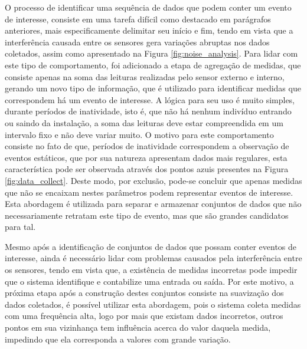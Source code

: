 O processo de identificar uma sequência de dados que podem conter um evento de interesse, consiste em uma tarefa difícil como destacado em parágrafos anteriores, mais especificamente delimitar seu início e fim, tendo em vista que a interferência causada entre os sensores gera variações abruptas nos dados coletados, assim como apresentado na Figura \ref{fig:noise_analysis}. Para lidar com este tipo de comportamento, foi adicionado a etapa de agregação de medidas, que consiste apenas na soma das leituras realizadas pelo sensor externo e interno, gerando um novo tipo de informação, que é utilizado para identificar medidas que correspondem há um evento de interesse. A lógica para seu uso é muito simples, durante períodos de inatividade, isto é, que não há nenhum indivíduo entrando ou saindo da instalação, a soma das leituras deve estar compreendida em um intervalo fixo e não deve variar muito. O motivo para este comportamento consiste no fato de que, períodos de inatividade correspondem a observação de eventos estáticos, que por sua natureza  apresentam dados mais regulares, esta característica pode ser observada através dos pontos azuis presentes na Figura \ref{fig:data_collect}. Deste modo, por exclusão, pode-se concluir que apenas medidas que não se encaixam nestes parâmetros podem representar eventos de interesse. Esta abordagem é utilizada para separar e armazenar conjuntos de dados que não necessariamente retratam este tipo de evento, mas que são grandes candidatos para tal.

Mesmo após a identificação de conjuntos de dados que possam conter eventos de interesse, ainda é necessário lidar com problemas causados pela interferência entre os sensores, tendo em vista que, a existência de medidas incorretas pode impedir que o sistema identifique e contabilize uma entrada ou saída. Por este motivo, a próxima etapa após a construção destes conjuntos consiste na suavização dos dados coletados, é possível utilizar esta abordagem, pois o sistema coleta medidas com uma frequência alta, logo por mais que existam dados incorretos, outros pontos em sua vizinhança tem influência acerca do valor daquela medida, impedindo que ela corresponda a valores com grande variação. 

